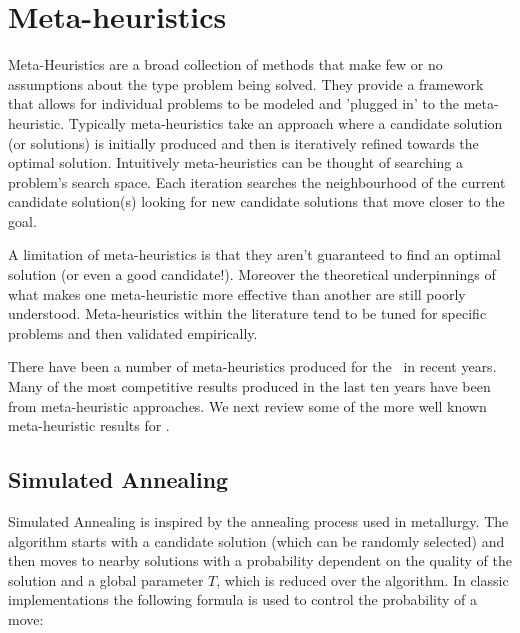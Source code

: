 \section{Meta-heuristics}
\label{sec:mh}

Meta-Heuristics are a broad collection of methods that make few or no assumptions about the type problem being solved. They provide a framework that allows for individual problems to be modeled and 'plugged in' to the meta-heuristic. Typically meta-heuristics take an approach where a candidate solution (or solutions) is initially produced and then is iteratively refined towards the optimal solution. Intuitively meta-heuristics can be thought of searching a problem's search space. Each iteration searches the neighbourhood of the current candidate solution(s) looking for new candidate solutions that move closer to the goal. 


A limitation of meta-heuristics is that they aren't guaranteed to find an optimal solution (or even a good candidate!). Moreover the theoretical underpinnings of what makes one meta-heuristic more effective than another are still poorly understood. Meta-heuristics within the literature tend to be tuned for specific problems and then validated empirically.

There have been a number of meta-heuristics produced for the \VRP\ in recent years. Many of the most competitive results produced in the last ten years have been from meta-heuristic approaches. We next review some of the more well known meta-heuristic results for \VRP.

\subsection{Simulated Annealing}

Simulated Annealing is inspired by the annealing process used in metallurgy. The algorithm starts with a candidate solution (which can be randomly selected) and then moves to nearby solutions with a probability dependent on the quality of the solution and a global parameter $T$, which is reduced over the algorithm. In classic implementations the following formula is used to control the probability of a move: 

